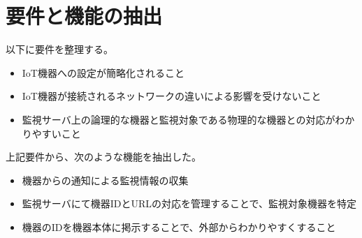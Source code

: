 \section{要件と機能の抽出}
以下に要件を整理する。
\begin{itemize}
\item IoT機器への設定が簡略化されること
\item IoT機器が接続されるネットワークの違いによる影響を受けないこと
\item 監視サーバ上の論理的な機器と監視対象である物理的な機器との対応がわかりやすいこと
\end{itemize}

上記要件から、次のような機能を抽出した。
\begin{itemize}
\item 機器からの通知による監視情報の収集
\item 監視サーバにて機器IDとURLの対応を管理することで、監視対象機器を特定
\item 機器のIDを機器本体に掲示することで、外部からわかりやすくすること
\end{itemize}


